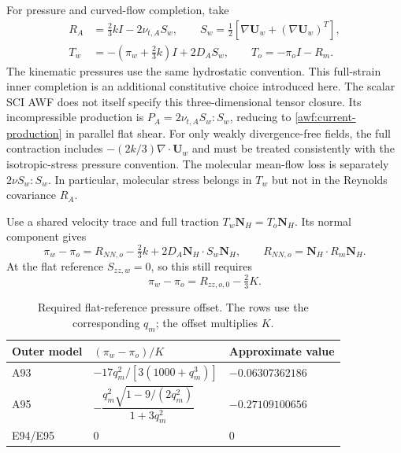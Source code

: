 \documentclass[11pt,a4paper]{article}
\numberwithin{equation}{section}
\begin{document}
For pressure and curved-flow completion, take
\begin{equation}
 \begin{aligned}
 R_A&=\tfrac23kI-2\nu_{t,A}S_w,\qquad
 S_w=\tfrac12[\nabla\boldsymbol U_w+(\nabla\boldsymbol U_w)^T],\\
 T_w&=-(\pi_w+\tfrac23k)I+2D_AS_w,\qquad
 T_o=-\pi_oI-R_m .
 \end{aligned}
 \label{awf:inner-outer-stress}
\end{equation}
The kinematic pressures use the same hydrostatic convention.
This full-strain inner completion is an additional constitutive
choice introduced here. The scalar SCI AWF does not itself specify
this three-dimensional tensor closure. Its incompressible production is $P_A=2\nu_{t,A}S_w:S_w$,
reducing to \cref{awf:current-production} in parallel flat shear.
For only weakly divergence-free fields, the full contraction includes
$-(2k/3)\nabla\cdot\boldsymbol U_w$ and must be treated consistently
with the isotropic-stress pressure convention. The molecular mean-flow
loss is separately $2\nu S_w:S_w$. In particular, molecular stress
belongs in $T_w$ but not in the Reynolds covariance $R_A$.

Use a shared velocity trace and full traction
$T_w\boldsymbol N_H=T_o\boldsymbol N_H$.
Its normal component gives
\begin{equation}
 \pi_w-\pi_o
 =R_{NN,o}-\tfrac23k+2D_A\boldsymbol N_H\cdot S_w\boldsymbol N_H,
 \qquad R_{NN,o}=\boldsymbol N_H\cdot R_m\boldsymbol N_H.
 \label{awf:normal-pressure}
\end{equation}
At the flat reference $S_{zz,w}=0$, so this still requires
\begin{equation}
 \boxed{\pi_w-\pi_o=R_{zz,o,0}-\tfrac23K.}
 \label{awf:pressure-offset}
\end{equation}

\begin{table}[htbp]
\centering
\caption{Required flat-reference pressure offset. The rows use the
corresponding $q_m$; the offset multiplies $K$.}
\label{awf:pressure-table}
\begin{tabular}{lll}
\toprule
Outer model & $(\pi_w-\pi_o)/K$ & Approximate value\\
\midrule
A93 & $-17q_m^2/[3(1000+q_m^3)]$ & $-0.06307362186$\\[1mm]
A95 & $-\dfrac{q_m^2\sqrt{1-9/(2q_m^2)}}{1+3q_m^2}$
    & $-0.27109100656$\\[2mm]
E94/E95 & $0$ & $0$\\
\bottomrule
\end{tabular}
\end{table}
\end{document}
